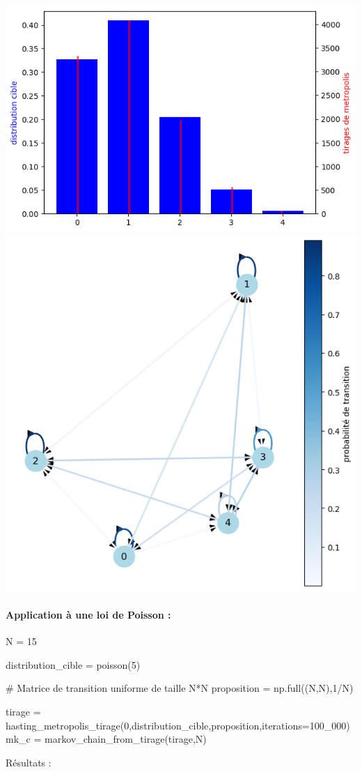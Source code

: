 \documentclass{article}
\begin{document}
\includegraphics[scale=0.25]{loi bin.png}
\includegraphics[scale=0.25]{loi bin graph.png}

\newpage
\paragraph{Application à une loi de Poisson :}
\begin{center}
\begin{python}
N = 15

distribution_cible = poisson(5)

# Matrice de transition uniforme de taille N*N
proposition = np.full((N,N),1/N)

tirage = hasting_metropolis_tirage(0,distribution_cible,proposition,iterations=100_000)
mk_c = markov_chain_from_tirage(tirage,N)
\end{python}
\end{center}
Résultats :
\end{document}
